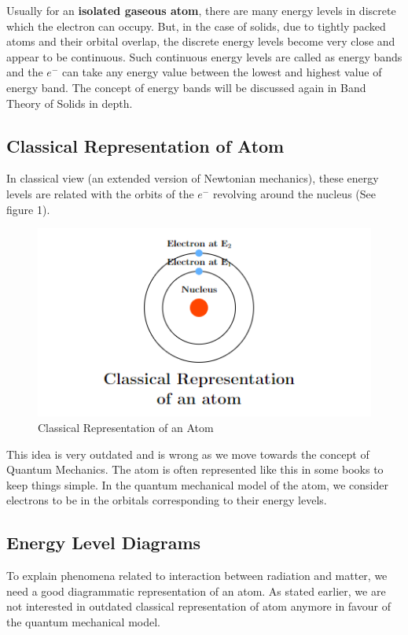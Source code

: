 \documentclass[12pt]{article}
\begin{document}
Usually for an \textbf{isolated gaseous atom}, there are many energy levels in discrete which the electron can occupy. But, in the case of solids, due to tightly packed atoms and their orbital overlap, the discrete energy levels become very close and appear to be continuous. Such continuous energy levels are called as energy bands and the $e^{-}$ can take any energy value between the lowest and highest value of energy band. The concept of energy bands will be discussed again in Band Theory of Solids in depth.

\subsection{Classical Representation of Atom}

In classical view (an extended version of Newtonian mechanics), these energy levels are related with the orbits of the $e^{-}$ revolving around the nucleus (See figure 1).

\begin{figure}[H]
    \centering
    \includegraphics[scale=0.5]{./img/01_classical_atom.png}
    \caption{Classical Representation of an Atom}
\end{figure}

This idea is very outdated and is wrong as we move towards the concept of Quantum Mechanics. The atom is often represented like this in some books to keep things simple. In the quantum mechanical model of the atom, we consider electrons to be in the orbitals corresponding to their energy levels.

\subsection{Energy Level Diagrams}

To explain phenomena related to interaction between radiation and matter, we need a good diagrammatic representation of an atom. As stated earlier, we are not interested in outdated classical representation of atom anymore in favour of the quantum mechanical model. \vspace{.2cm}
\end{document}
